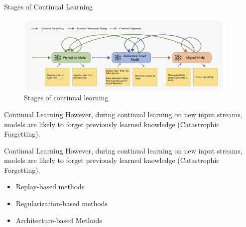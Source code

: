 \documentclass[t]{beamer}
\begin{document}
\begin{frame}{Stages of Continual Learning}
  \vspace{1cm}
  \begin{figure}[htbp]
    \centering
    \includegraphics[width=0.95\textwidth]{CL stages.png}
    \caption{Stages of continual learning \cite{Wu24}}
    \label{fig:acl_stages}
  \end{figure}
\end{frame}

\begin{frame}{Continual Learning}
  \vspace{1cm}
  However, during continual learning on new input streams, models are likely to forget
  previously learned knowledge (Catastrophic Forgetting). \cite{Gupta23}
\end{frame}

\begin{frame}{Continual Learning}
  \vspace{1cm}
  However, during continual learning on new input streams, models are likely to forget
  previously learned knowledge (Catastrophic Forgetting). \cite{Gupta23}
  \vspace{1cm}
  \begin{itemize}
    \item Replay-based methods
    \item Regularization-based methods
    \item Architecture-based Methods
  \end{itemize}
\end{frame}
\end{document}
